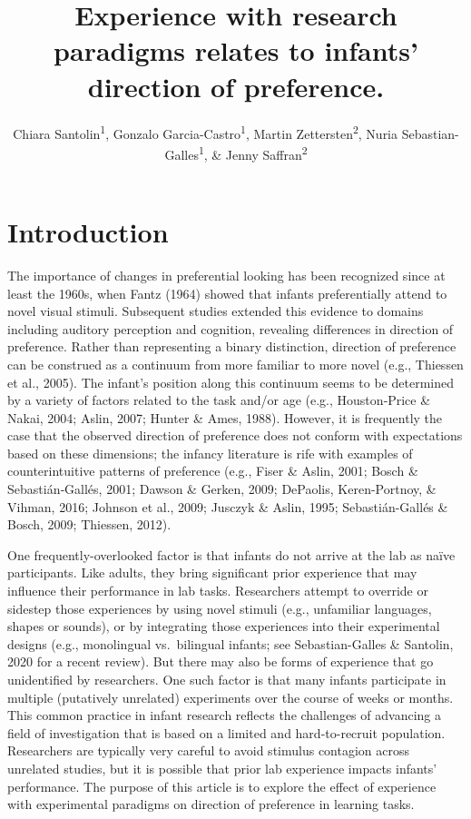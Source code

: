 \documentclass[
  english,
  man,man,floatsintext]{apa6}
\title{Experience with research paradigms relates to infants' direction of preference.}
\author{Chiara Santolin\textsuperscript{1}, Gonzalo Garcia-Castro\textsuperscript{1}, Martin Zettersten\textsuperscript{2}, Nuria Sebastian-Galles\textsuperscript{1}, \& Jenny Saffran\textsuperscript{2}}
\date{}
\affiliation{\vspace{0.5cm}\textsuperscript{1} Center for Brain and Cognition, Universitat Pompeu Fabra\\\textsuperscript{2} Waisman Center \& Department of Psychology, University of Wisconsin-Madison}
\begin{document}
\maketitle

\hypertarget{introduction}{%
\section{Introduction}\label{introduction}}

The importance of changes in preferential looking has been recognized since at least the 1960s, when Fantz (1964) showed that infants preferentially attend to novel visual stimuli. Subsequent studies extended this evidence to domains including auditory perception and cognition, revealing differences in direction of preference. Rather than representing a binary distinction, direction of preference can be construed as a continuum from more familiar to more novel (e.g., Thiessen et al., 2005). The infant's position along this continuum seems to be determined by a variety of factors related to the task and/or age (e.g., Houston‐Price \& Nakai, 2004; Aslin, 2007; Hunter \& Ames, 1988). However, it is frequently the case that the observed direction of preference does not conform with expectations based on these dimensions; the infancy literature is rife with examples of counterintuitive patterns of preference (e.g., Fiser \& Aslin, 2001; Bosch \& Sebastián‐Gallés, 2001; Dawson \& Gerken, 2009; DePaolis, Keren-Portnoy, \& Vihman, 2016; Johnson et al., 2009; Jusczyk \& Aslin, 1995; Sebastián-Gallés \& Bosch, 2009; Thiessen, 2012).

One frequently-overlooked factor is that infants do not arrive at the lab as naïve participants. Like adults, they bring significant prior experience that may influence their performance in lab tasks. Researchers attempt to override or sidestep those experiences by using novel stimuli (e.g., unfamiliar languages, shapes or sounds), or by integrating those experiences into their experimental designs (e.g., monolingual vs.~bilingual infants; see Sebastian-Galles \& Santolin, 2020 for a recent review). But there may also be forms of experience that go unidentified by researchers. One such factor is that many infants participate in multiple (putatively unrelated) experiments over the course of weeks or months. This common practice in infant research reflects the challenges of advancing a field of investigation that is based on a limited and hard-to-recruit population. Researchers are typically very careful to avoid stimulus contagion across unrelated studies, but it is possible that prior lab experience impacts infants' performance. The purpose of this article is to explore the effect of experience with experimental paradigms on direction of preference in learning tasks.
\end{document}
